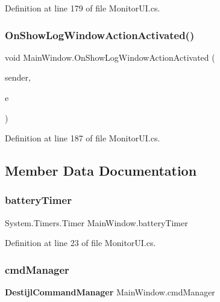 Definition at line 179 of file Monitor\+U\+I.\+cs.

\mbox{\label{class_main_window_a87132738a6ca496303940d56e091bdc7}} 
\subsubsection{On\+Show\+Log\+Window\+Action\+Activated()}
{\footnotesize\ttfamily void Main\+Window.\+On\+Show\+Log\+Window\+Action\+Activated (\begin{DoxyParamCaption}\item[{object}]{sender,  }\item[{Event\+Args}]{e }\end{DoxyParamCaption})\hspace{0.3cm}{\ttfamily [protected]}}



Definition at line 187 of file Monitor\+U\+I.\+cs.



\subsection{Member Data Documentation}
\mbox{\label{class_main_window_a57f0325d8b8a63be586001b9a469d9ae}} 
\subsubsection{battery\+Timer}
{\footnotesize\ttfamily System.\+Timers.\+Timer Main\+Window.\+battery\+Timer\hspace{0.3cm}{\ttfamily [private]}}



Definition at line 23 of file Monitor\+U\+I.\+cs.

\mbox{\label{class_main_window_a0b60450970b8a6fb6e016d5c0728e474}} 
\subsubsection{cmd\+Manager}
{\footnotesize\ttfamily \textbf{ Destijl\+Command\+Manager} Main\+Window.\+cmd\+Manager\hspace{0.3cm}{\ttfamily [private]}}




